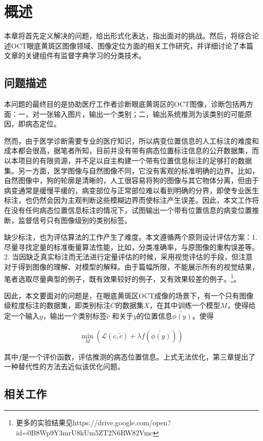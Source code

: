 \chapter{概述}
    本章将首先定义解决的问题，给出形式化表达，指出面对的挑战。然后，将综合论述OCT眼底黄斑区图像领域、图像定位方面的相关工作研究，并详细讨论了本篇文章的关键组件有监督字典学习的分类技术。

\section{问题描述}
    本问题的最终目的是协助医疗工作者诊断眼底黄斑区的OCT图像，诊断包括两方面：一，对一张输入图片，输出一个类别；二，输出系统推测为该类别的可能原因，即病态定位。

    然而，由于医学诊断需要专业的医疗知识，所以病变位置信息的人工标注的难度和成本都会很高，据笔者所知，目前并没有带有病态位置标注信息的公开数据集，而以本项目的有限资源，并不足以自主构建一个带有位置信息标注的足够打的数据集。另一方面，医学图像与自然图像不同，它没有客观的标准明确的边界。比如，自然图像中，狗的轮廓是清晰的，人工很容易将狗的图像与其它物体分离，但由于病变通常是缓慢平缓的，病变部位与正常部位难以看到明确的分界，即使专业医生标注，也仍然会因为主观判断这些模糊边界而使标注产生误差。因此，本文工作将在没有任何病态位置信息标注的情况下，试图输出一个带有位置信息的病变位置推断，监督信号只有图像级别的类别标签。

    缺少标注，也为评估算法的工作产生了难度。本文遵循两个原则设计评估方案：1. 尽量寻找定量的标准衡量算法性能，比如，分类准确率，与原图像的重构误差等。2. 当因缺乏真实标注而无法进行定量评估的时候，采用视觉评估的手段，但注意对于得到图像的理解、对模型的解释。由于篇幅所限，不能展示所有的视觉结果，笔者选取尽量典型的例子，既有效果较好的例子，又有效果较差的例子。\footnote{更多的实验结果见https://drive.google.com/open?id=0B8Wp9Y3mrU8kUm5ZT2N6RW82Vmc}。

    因此，本文要面对的问题是，在眼底黄斑区OCT成像的场景下，有一个只有图像级粒度标注的数据集，即类别标注$C$的数据集$X$，在其中训练一个模型$M$，使得给定一个输入$y$，输出一个类别标签$\tilde{c}$ 和关于$y$的位置信息$\tilde{\phi(y)}$。使得

    \begin{align}
        \min _M (\mathcal{L}(c, \tilde{c}) + \lambda f(\tilde{\phi(y)}))
    \end{align}

    其中$f$是一个评价函数，评估推测的病态位置信息。上式无法优化，第三章提出了一种替代性的方法去近似该优化问题。

\section{相关工作}

